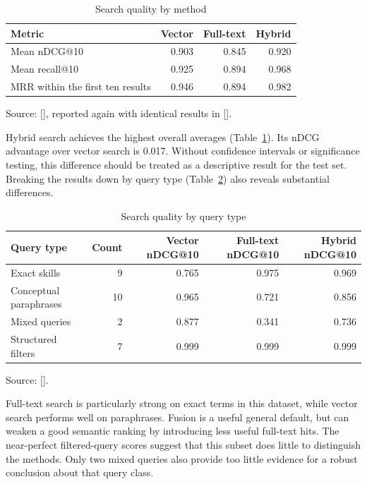 \documentclass[11pt,a4paper]{article}
\newcommand{\reflink}[1]{\hyperlink{ref:#1}{#1}}
\newcommand{\refsep}{}
\newcommand{\refs}[1]{\begingroup
  \gdef\refsep{}%
  \renewcommand*{\do}[1]{\refsep\reflink{##1}\gdef\refsep{, }}%
  [\docsvlist{#1}]\endgroup}
\begin{document}
\begin{table}[htbp]
\centering
\caption{Search quality by method}
\label{tab:search-method}
\begin{tabular}{@{}lrrr@{}}
\toprule
\textbf{Metric} & \textbf{Vector} & \textbf{Full-text} & \textbf{Hybrid} \\
\midrule
Mean nDCG@10 & 0.903 & 0.845 & 0.920 \\
Mean recall@10 & 0.925 & 0.894 & 0.968 \\
MRR within the first ten results & 0.946 & 0.894 & 0.982 \\
\bottomrule
\end{tabular}
\par\smallskip\footnotesize Source: \refs{P6}, reported again with identical results in \refs{P10}.
\end{table}

Hybrid search achieves the highest overall averages (Table~\ref{tab:search-method}). Its nDCG advantage over vector search is 0.017. Without confidence intervals or significance testing, this difference should be treated as a descriptive result for the test set. Breaking the results down by query type (Table~\ref{tab:search-type}) also reveals substantial differences.

\begin{table}[htbp]
\centering
\caption{Search quality by query type}
\label{tab:search-type}
\begin{tabular}{@{}lrrrr@{}}
\toprule
\textbf{Query type} & \textbf{Count} & \textbf{Vector nDCG@10} & \textbf{Full-text nDCG@10} & \textbf{Hybrid nDCG@10} \\
\midrule
Exact skills & 9 & 0.765 & 0.975 & 0.969 \\
Conceptual paraphrases & 10 & 0.965 & 0.721 & 0.856 \\
Mixed queries & 2 & 0.877 & 0.341 & 0.736 \\
Structured filters & 7 & 0.999 & 0.999 & 0.999 \\
\bottomrule
\end{tabular}
\par\smallskip\footnotesize Source: \refs{P6}.
\end{table}

Full-text search is particularly strong on exact terms in this dataset, while vector search performs well on paraphrases. Fusion is a useful general default, but can weaken a good semantic ranking by introducing less useful full-text hits. The near-perfect filtered-query scores suggest that this subset does little to distinguish the methods. Only two mixed queries also provide too little evidence for a robust conclusion about that query class.
\end{document}
